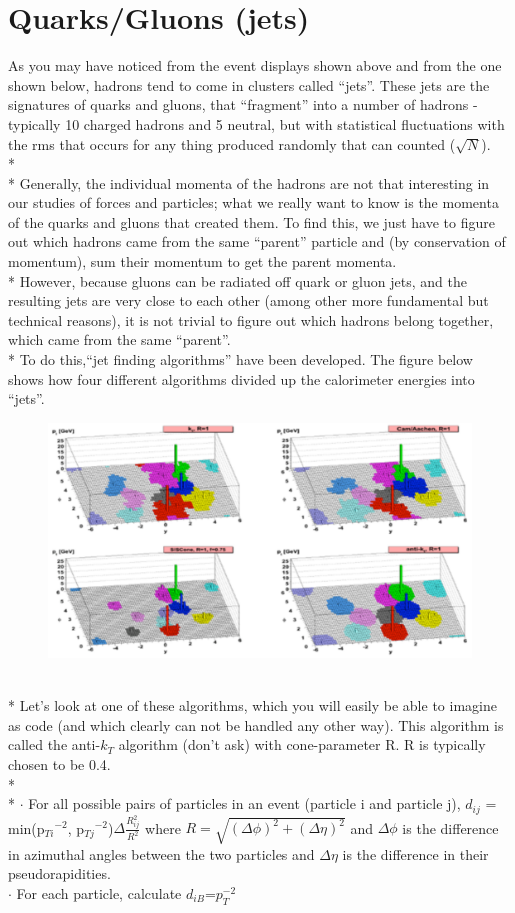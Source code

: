 \section{Quarks/Gluons (jets)}
As you may have noticed from the event displays shown above and from the one shown below, hadrons tend to come in clusters called ``jets''. These jets are the signatures of quarks and gluons, that ``fragment'' into a number of hadrons - typically 10 charged hadrons and 5 neutral, but with statistical fluctuations with the rms that occurs for any thing produced randomly that can counted ($\sqrt{N}$).
\\*
\\*
Generally, the individual momenta of the hadrons are not that interesting in our studies of forces and particles; what we really want to know is the momenta of the quarks and gluons that created them. To find this, we just have to figure out which hadrons came from the same ``parent'' particle and (by conservation of momentum), sum their momentum to get the parent momenta.
\\*
\noindent
However, because gluons can be radiated off quark or gluon jets, and the resulting jets are very close to each other (among other more fundamental but technical reasons), it is not trivial to figure out which hadrons belong together, which came from the same ``parent''.
\\*
To do this,``jet finding algorithms'' have been developed. The figure below shows how four different algorithms divided up the calorimeter energies into ``jets''.
\begin{figure}[h]
\centering\includegraphics[scale=0.6]{./particleID/Pictures/fig5.pdf}
\end{figure}
\\*
\noindent
Let's look at one of these algorithms, which you will easily be able to imagine as code (and which clearly can not be handled any other way).  This algorithm is called the anti-$k_{T}$ algorithm (don't ask) with cone-parameter R. R is typically chosen to be 0.4.
\\*
\\*
$\cdot$ For all possible pairs of particles in an event (particle i and particle j), $d_{ij}$ = min(p$_{Ti}$$^{-2}$, p$_{Tj}$$^{-2}$)$\Delta\frac{R_{ij}^{2}}{R^{2}}$ where $R=\sqrt{(\Delta\phi)^{2}+(\Delta\eta)^{2}}$ and $\Delta\phi$ is the difference in azimuthal angles between the two particles and $\Delta\eta$ is the difference in their pseudorapidities.
\\
\noindent
$\cdot$ For each particle, calculate $d_{iB}$=$p_{T}^{-2}$

